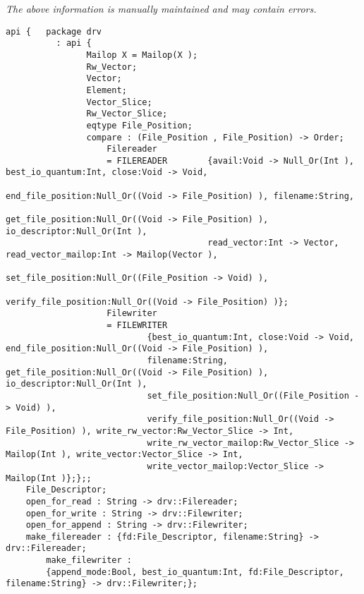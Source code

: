 \label{api:Winix\_Extended\_File\_Io\_Driver\_For\_Os}

{\tiny \it The above information is manually maintained and may contain errors.}
\begin{verbatim}
api {   package drv
          : api {
                Mailop X = Mailop(X );
                Rw_Vector;
                Vector;
                Element;
                Vector_Slice;
                Rw_Vector_Slice;
                eqtype File_Position;
                compare : (File_Position , File_Position) -> Order;
                    Filereader
                    = FILEREADER        {avail:Void -> Null_Or(Int ), best_io_quantum:Int, close:Void -> Void,
                                        end_file_position:Null_Or((Void -> File_Position) ), filename:String,
                                        get_file_position:Null_Or((Void -> File_Position) ), io_descriptor:Null_Or(Int ),
                                        read_vector:Int -> Vector, read_vector_mailop:Int -> Mailop(Vector ),
                                        set_file_position:Null_Or((File_Position -> Void) ),
                                        verify_file_position:Null_Or((Void -> File_Position) )};
                    Filewriter
                    = FILEWRITER
                            {best_io_quantum:Int, close:Void -> Void, end_file_position:Null_Or((Void -> File_Position) ),
                            filename:String, get_file_position:Null_Or((Void -> File_Position) ), io_descriptor:Null_Or(Int ),
                            set_file_position:Null_Or((File_Position -> Void) ),
                            verify_file_position:Null_Or((Void -> File_Position) ), write_rw_vector:Rw_Vector_Slice -> Int,
                            write_rw_vector_mailop:Rw_Vector_Slice -> Mailop(Int ), write_vector:Vector_Slice -> Int,
                            write_vector_mailop:Vector_Slice -> Mailop(Int )};};;
    File_Descriptor;
    open_for_read : String -> drv::Filereader;
    open_for_write : String -> drv::Filewriter;
    open_for_append : String -> drv::Filewriter;
    make_filereader : {fd:File_Descriptor, filename:String} -> drv::Filereader;
        make_filewriter :
        {append_mode:Bool, best_io_quantum:Int, fd:File_Descriptor, filename:String} -> drv::Filewriter;};
\end{verbatim}
